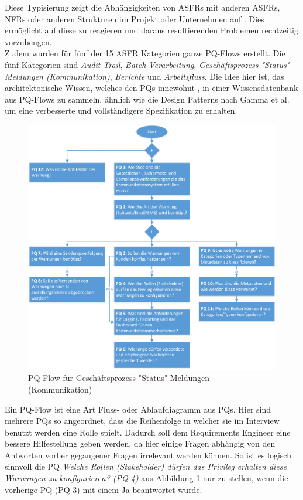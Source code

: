 Diese Typisierung zeigt die Abhängigkeiten von ASFRs mit anderen ASFRs, NFRs oder anderen Strukturen im Projekt oder Unternehmen auf \cite{Ros02}. Dies ermöglicht auf diese zu reagieren und daraus resultierenden Problemen rechtzeitig vorzubeugen. \\

Zudem wurden für fünf der 15 ASFR Kategorien ganze PQ-Flows erstellt. Die fünf Kategorien sind \textit{Audit Trail}, \textit{Batch-Verarbeitung}, \textit{Geschäftsprozess "Status" Meldungen (Kommunikation)}, \textit{Berichte} und \textit{Arbeitsfluss}. Die Idee hier ist, das architektonische Wissen, welches den PQs innewohnt \cite{Ros02}, in einer Wissensdatenbank aus PQ-Flows zu sammeln, ähnlich wie die Design Patterns nach Gamma et al. \cite{Ros03} um eine verbesserte und vollständigere Spezifikation zu erhalten. \\

\begin{figure}[h]
	\centering
	\includegraphics[scale=0.45]{pqflow_communication.jpg} 
	\caption{PQ-Flow für Geschäftsprozess "Status" Meldungen (Kommunikation) \cite{Ros01}}\label{fig_pqflow_communication}
\end{figure}

Ein PQ-Flow ist eine Art Fluss- oder Ablaufdiagramm aus PQs. Hier sind mehrere PQs so angeordnet, dass die Reihenfolge in welcher sie im Interview benutzt werden eine Rolle spielt. Dadurch soll dem Requirements Engineer eine bessere Hilfestellung geben werden, da hier einige Fragen abhängig von den Antworten vorher gegangener Fragen irrelevant werden können. So ist es logisch sinnvoll die PQ \textit{Welche Rollen (Stakeholder) dürfen das Privileg erhalten diese Warnungen zu konfigurieren? (PQ 4)} aus Abbildung \ref{fig_pqflow_communication} nur zu stellen, wenn die vorherige PQ (PQ 3) mit einem Ja beantwortet wurde. \\


